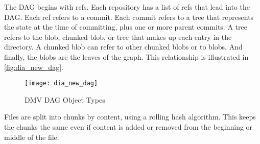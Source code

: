 The DAG begins with refs. Each repository has a list of refs that lead into the
DAG. Each ref refers to a commit. Each commit refers to a tree that represents
the state at the time of committing, plus one or more parent commits. A tree
refers to the blob, chunked blob, or tree that makes up each entry in the
directory. A chunked blob can refer to other chunked blobs or to blobs. And
finally, the blobs are the leaves of the graph. This relationship is illustrated
in \autoref{fig:dia_new_dag}.


\begin{figure}[h]
    \caption{DMV DAG Object Types}
    \label{fig:dia_new_dag}
    \centering
        \texttt{[image: dia\_new\_dag]}
\end{figure}



Files are split into chunks by content, using a rolling hash algorithm. This
keeps the chunks the same even if content is added or removed from the beginning
or middle of the file.






